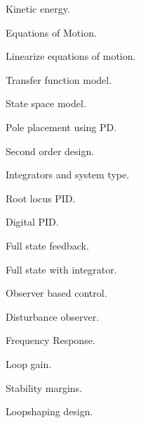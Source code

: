 
\par{}
\begin{multicols}{2}
\begin{description}
\setlength{\itemsep}{0pt}
\setlength{\parskip}{0pt}
	\item {\bf{}} Kinetic energy.
	\item {\bf{}} Equations of Motion.
	\item {\bf{}} Linearize equations of motion.
	\item {\bf{}} Transfer function model.
	\item {\bf{}} State space model.
	\item {\bf{}} Pole placement using PD.
	\item {\bf{}} Second order design.
	\item {\bf{}} Integrators and system type.
	\item {\bf{}} Root locus PID.
	\item {\bf{}} Digital PID.
	\item {\bf{}} Full state feedback.
	\item {\bf{}} Full state with integrator.
	\item {\bf{}} Observer based control.
	\item {\bf{}} Disturbance observer.
	\item {\bf{}} Frequency Response.
	\item {\bf{}} Loop gain.
	\item {\bf{}} Stability margins.
	\item {\bf{}} Loopshaping design.
\end{description}
\end{multicols}
